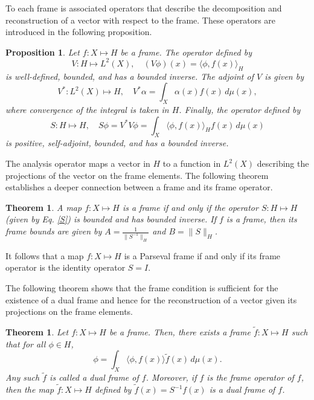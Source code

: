 \documentclass{article}
\newtheorem{prop}[defn]{Proposition}
\newtheorem{thm}[defn]{Theorem}
\newcommand{\brak}[1]{\langle #1\rangle}
\begin{document}
To each frame is associated operators that describe the decomposition and reconstruction of a vector with respect to the frame. These operators are introduced in the following proposition.
\begin{prop} \label{Operators}
Let $f:X\mapsto H$ be a frame. The operator defined by
\begin{equation}
V:H\mapsto L^2(X), \quad
(V\phi)(x) = \brak{\phi, f(x)}_H
\tag{Analysis Operator}
\end{equation}
is well-defined, bounded, and has a bounded inverse. The adjoint of $V$ is given by
\begin{equation}
V^*:L^2(X)\mapsto H, \quad
V^*\alpha = \int_X \alpha(x)f(x)\,d\mu(x),
\tag{Synthesis Operator}
\end{equation}
where convergence of the integral is taken in $H$. Finally, the operator defined by
\begin{equation} \label{S}
S:H\mapsto H, \quad
S\phi = V^*V\phi = \int_X\brak{\phi, f(x)}_H f(x)\,d\mu(x)
\tag{Frame Operator}
\end{equation}
is positive, self-adjoint, bounded, and has a bounded inverse.
\end{prop}

The analysis operator maps a vector in $H$ to a function in $L^2(X)$ describing the projections of the vector on the frame elements. 
The following theorem establishes a deeper connection between a frame and its frame operator.

\begin{thm} \label{FrameS}
A map $f:X\mapsto H$ is a frame if and only if the operator $S:H\mapsto H$ (given by Eq. \ref{S}) is bounded and has bounded inverse. If $f$ is a frame, then its frame bounds are given by $A=\frac{1}{\|S^{-1}\|_H}$ and $B=\|S\|_H$.
\end{thm}
\noindent It follows that a map $f:X\mapsto H$ is a Parseval frame if and only if its frame operator is the identity operator $S=I$.

The following theorem shows that the frame condition is sufficient for the existence of a dual frame and hence for the reconstruction of a vector given its projections on the frame elements.
\begin{thm} \label{DualFrame}
Let $f:X\mapsto H$ be a frame. Then, there exists a frame $\tilde{f}:X\mapsto H$ such that for all $\phi\in H$,
\begin{equation}
\phi = \int_X\brak{\phi, f(x)} \tilde{f}(x)\,d\mu(x).
\tag{Reconstruction Property}
\end{equation}
Any such $\tilde{f}$ is called a \emph{dual frame} of $f$. Moreover, if $f$ is the frame operator of $f$, then the map $\tilde{f}:X\mapsto H$ defined by $\tilde{f}(x)=S^{-1}f(x)$ is a dual frame of $f$.
\end{thm}
\end{document}
